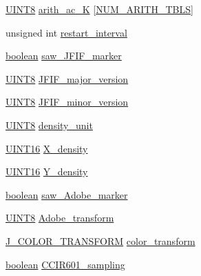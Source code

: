 \begin{DoxyCompactItemize}
\item 
\hyperlink{jmorecfg_8h_adfb9a8ea1dd59f151065f763e1e9acd6}{U\+I\+N\+T8} \hyperlink{structjpeg__decompress__struct_a9c54eeff8fd2af185c34be22e5c21420}{arith\+\_\+ac\+\_\+\+K} \mbox{[}\hyperlink{jpeglib_8h_a4efb0fccc8d9db72ca18f32a26fad6ab}{N\+U\+M\+\_\+\+A\+R\+I\+T\+H\+\_\+\+T\+B\+L\+S}\mbox{]}
\item 
unsigned int \hyperlink{structjpeg__decompress__struct_a7b3dea6fc8f77278bafd041059ecd16c}{restart\+\_\+interval}
\item 
\hyperlink{jmorecfg_8h_a7c6368b321bd9acd0149b030bb8275ed}{boolean} \hyperlink{structjpeg__decompress__struct_a1420a33f2921426c798d85104527fd85}{saw\+\_\+\+J\+F\+I\+F\+\_\+marker}
\item 
\hyperlink{jmorecfg_8h_adfb9a8ea1dd59f151065f763e1e9acd6}{U\+I\+N\+T8} \hyperlink{structjpeg__decompress__struct_ac5d65b5439fbcde7b0738e41b27de928}{J\+F\+I\+F\+\_\+major\+\_\+version}
\item 
\hyperlink{jmorecfg_8h_adfb9a8ea1dd59f151065f763e1e9acd6}{U\+I\+N\+T8} \hyperlink{structjpeg__decompress__struct_a75a27a410717002a2ec2f339a9142824}{J\+F\+I\+F\+\_\+minor\+\_\+version}
\item 
\hyperlink{jmorecfg_8h_adfb9a8ea1dd59f151065f763e1e9acd6}{U\+I\+N\+T8} \hyperlink{structjpeg__decompress__struct_a8d4afa82a43e8a7452b5e4f8276bbdb7}{density\+\_\+unit}
\item 
\hyperlink{jmorecfg_8h_a805c2c164bdd38d72a30c46e84fb568b}{U\+I\+N\+T16} \hyperlink{structjpeg__decompress__struct_a69f0da1031f16c621438d123921ba745}{X\+\_\+density}
\item 
\hyperlink{jmorecfg_8h_a805c2c164bdd38d72a30c46e84fb568b}{U\+I\+N\+T16} \hyperlink{structjpeg__decompress__struct_a2bfa78f638ae718f6601fd64a3b9f7aa}{Y\+\_\+density}
\item 
\hyperlink{jmorecfg_8h_a7c6368b321bd9acd0149b030bb8275ed}{boolean} \hyperlink{structjpeg__decompress__struct_aa117f97eb92feac14f6f91b599f1928c}{saw\+\_\+\+Adobe\+\_\+marker}
\item 
\hyperlink{jmorecfg_8h_adfb9a8ea1dd59f151065f763e1e9acd6}{U\+I\+N\+T8} \hyperlink{structjpeg__decompress__struct_aebe0766b99c4fbe0e8b2a78e5e91d107}{Adobe\+\_\+transform}
\item 
\hyperlink{jpeglib_8h_a26af503ae521188ce89abc2c7adee7f0}{J\+\_\+\+C\+O\+L\+O\+R\+\_\+\+T\+R\+A\+N\+S\+F\+O\+R\+M} \hyperlink{structjpeg__decompress__struct_a976c199570f66a35853ad08dac014bc3}{color\+\_\+transform}
\item 
\hyperlink{jmorecfg_8h_a7c6368b321bd9acd0149b030bb8275ed}{boolean} \hyperlink{structjpeg__decompress__struct_a57c63b368b579dc76944fe6dba1ecc96}{C\+C\+I\+R601\+\_\+sampling}

\end{DoxyCompactItemize}
